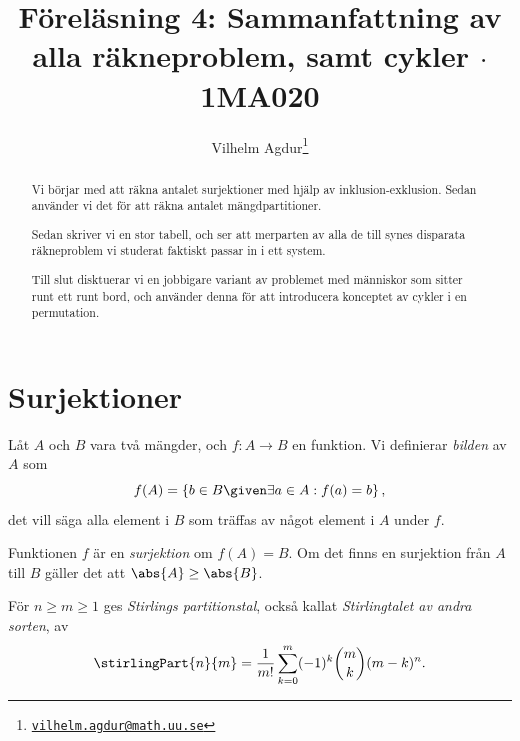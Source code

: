 \documentclass[nobib]{tufte-handout}
\title{Föreläsning 4: Sammanfattning av alla räkneproblem, samt cykler $\cdot$ 1MA020}
\author[Vilhelm Agdur]{Vilhelm Agdur\thanks{\href{mailto:vilhelm.agdur@math.uu.se}{\nolinkurl{vilhelm.agdur@math.uu.se}}}}
\begin{document}

\maketitle%

\begin{abstract}
\noindent
Vi börjar med att räkna antalet surjektioner med hjälp av inklusion-exklusion. Sedan använder vi det för att räkna antalet mängdpartitioner.

Sedan skriver vi en stor tabell, och ser att merparten av alla de till synes disparata räkneproblem vi studerat faktiskt passar in i ett system.

Till slut disktuerar vi en jobbigare variant av problemet med människor som sitter runt ett runt bord, och använder denna för att introducera konceptet av cykler i en permutation.
\end{abstract}

\section{Surjektioner}

\begin{definition}
  Låt $A$ och $B$ vara två mängder, och $f: A \to B$ en funktion. Vi definierar \emph{bilden} av $A$ som
  $$f(A) = \left\{b \in B \given \exists a\in A: f(a) = b\right\},$$
  det vill säga alla element i $B$ som träffas av något element i $A$ under $f$.

  Funktionen $f$ är en \emph{surjektion} om $f(A) = B$. Om det finns en surjektion från $A$ till $B$ gäller det att $\abs{A} \geq \abs{B}$.
\end{definition}

\begin{definition}
  För $n \geq m \geq 1$ ges \emph{Stirlings partitionstal}, också kallat \emph{Stirlingtalet av andra sorten}, av
  $$\stirlingPart{n}{m} = \frac{1}{m!}\sum_{k=0}^{m}(-1)^k\binom{m}{k}(m-k)^n.$$
\end{definition}
\end{document}
